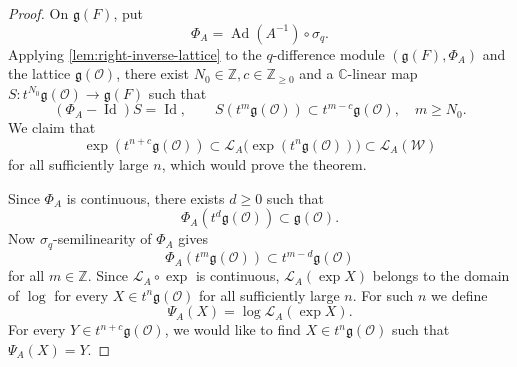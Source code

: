 \documentclass[11pt]{amsart}
\numberwithin{equation}{section}
\theoremstyle{definition}
\theoremstyle{remark}
\begin{document}
\begin{proof}
On $\mathfrak{g}(F)$, put
\[
  \Phi_A=\operatorname{Ad}(A^{-1})\circ\sigma_q.
\]
Applying \cref{lem:right-inverse-lattice} to the $q$-difference module $(\mathfrak{g}(F),\Phi_A)$ and the lattice $\mathfrak{g}(\mathcal{O})$,
there exist $N_0\in\mathbb{Z},c\in\mathbb{Z}_{\geq 0}$ and a $\mathbb{C}$-linear map $S:t^{N_{0}}\mathfrak{g}(\mathcal{O})\rightarrow\mathfrak{g}(F)$ such that
\begin{equation}\label{eq:linear-estimate}
  (\Phi_A-\operatorname{Id})S=\operatorname{Id},
  \qquad
  S(t^m\mathfrak{g}(\mathcal{O}))\subset t^{m-c}\mathfrak{g}(\mathcal{O}),
  \quad m\geq N_0.
\end{equation}
We claim that 
\[
  \exp(t^{n+c}\mathfrak{g}(\mathcal{O}))
  \subset\mathcal{L}_A\bigl(\exp(t^n\mathfrak{g}(\mathcal{O}))\bigr)
  \subset\mathcal{L}_A(\mathcal W)
\]
for all sufficiently large $n$, which would prove the theorem. 

Since $\Phi_A$ is continuous, there exists $d\geq0$ such that
\begin{equation}\label{eq:phi-base}
  \Phi_A(t^d\mathfrak{g}(\mathcal{O}))\subset \mathfrak{g}(\mathcal{O}).
\end{equation}
Now $\sigma_q$-semilinearity of $\Phi_A$ gives
\begin{equation}\label{eq:phi-shift}
  \Phi_A(t^m\mathfrak{g}(\mathcal{O}))\subset t^{m-d}\mathfrak{g}(\mathcal{O})
\end{equation}
for all $m\in\mathbb Z$. Since $\mathcal{L}_{A}\circ\exp$ is continuous, $\mathcal{L}_A(\exp X)$ belongs to the domain of $\log$ for every $X\in t^n\mathfrak{g}(\mathcal{O})$ for all sufficiently large
$n$. For such $n$ we define
\[
\Psi_A(X)=\log\mathcal{L}_A(\exp X).
\] 
For every $Y\in t^{n+c}\mathfrak{g}(\mathcal{O})$, we would like to find $X\in t^{n}\mathfrak{g}(\mathcal{O})$ such that $\Psi_A(X)=Y$. 


\end{proof}
\end{document}
